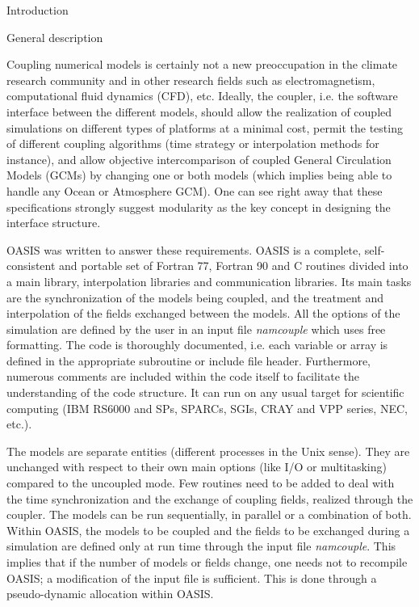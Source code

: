\newpage
\begin{section}{Introduction}

\begin{subsection}{General description}

Coupling numerical models is certainly not a new preoccupation in the climate
research community and in other research fields such as electromagnetism, 
computational fluid dynamics (CFD), etc. Ideally, the coupler, i.e. the
software interface between the different models, should allow the realization
of coupled simulations on different types of platforms at a minimal cost, 
permit the testing of different 
coupling algorithms (time strategy or interpolation methods for instance), 
and allow objective intercomparison of coupled General Circulation Models 
(GCMs) by changing one or both models (which implies being able to handle 
any Ocean or Atmosphere GCM). One can see right away that these specifications 
strongly suggest modularity as the key concept in designing the interface 
structure. 

\vspace{0.4cm}

OASIS was written to answer these requirements.
OASIS is a complete, self-consistent and portable set of Fortran 77, Fortran 
90 and C 
routines divided into a main library, interpolation libraries and 
communication libraries. Its main tasks
are the synchronization of the models being coupled, and the treatment and 
interpolation of the fields exchanged between the models. 
All the options of the simulation are defined by the
user in an input file {\em namcouple} which uses free formatting. The code
is thoroughly documented, i.e. each variable or array is defined in the 
appropriate subroutine or include file header. Furthermore, numerous comments
are included within the code itself to facilitate the understanding of the 
code structure.
It can run on any usual target for scientific computing
(IBM RS6000 and SPs, SPARCs, SGIs, CRAY and VPP series, NEC, etc.). 

\vspace{0.4cm}

The models are
separate entities (different processes in the Unix sense). They are unchanged
with respect to their own main options (like I/O or multitasking) compared to
the uncoupled mode. Few routines need to be added to deal with the time
synchronization and the exchange of coupling fields, realized through the
coupler. The models can be run sequentially, in parallel or a combination of
both. 
Within OASIS, the models to be coupled and the fields to be exchanged during
a simulation are defined only at run time through the input file 
{\em namcouple}. This implies that if the 
number of models or fields change, one needs not to recompile OASIS; a 
modification of the input file is sufficient. This is done through a 
pseudo-dynamic allocation within OASIS.


\end{subsection}
\end{section}
